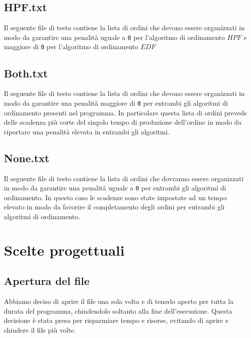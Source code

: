 \documentclass[a4paper]{article}
\begin{document}
\subsection{HPF.txt}
Il seguente file di testo contiene la lista di ordini che devono essere organizzati in
modo da garantire una penalità uguale a \texttt{0} per l'algoritmo di ordinamento
\textbf{$HPF$} e maggiore di \texttt{0} per l'algoritmo di
ordinamento \textbf{$EDF$}
\subsection{Both.txt}
Il seguente file di testo contiene la lista di ordini che devono essere organizzati in
modo da garantire una penalità maggiore di \texttt{0} per entrambi gli algoritmi di
ordinamento presenti nel programma. In particolare questa lista di ordini prevede delle
scadenza più corte del singolo tempo di produzione dell'ordine in modo da riportare una
penalità elevata in entrambi gli algoritmi.
\subsection{None.txt}
Il seguente file di testo contiene la lista di ordini che dovranno essere organizzati in
modo da garantire una penalità uguale a \texttt{0} per entrambi gli algoritmi di
ordinamento. In questo caso le scadenze sono state impostate ad un tempo elevato in modo
da favorire il completamento degli ordini per entrambi gli algoritmi di ordinamento.

\section{Scelte progettuali}
\subsection{Apertura del file}
Abbiamo deciso di aprire il file una sola volta e di tenerlo aperto per tutta la durata
del programma, chiudendolo soltanto alla fine dell'esecuzione. Questa decisione è stata
presa per risparmiare tempo e risorse, evitando di aprire e chiudere il file più volte.
\end{document}
